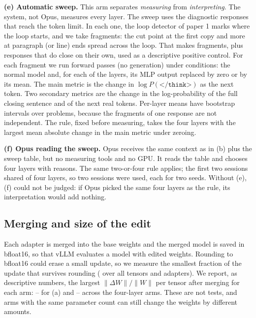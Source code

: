 \documentclass[11pt]{article}
\begin{document}
\textbf{(e) Automatic sweep.} This arm separates \emph{measuring} from \emph{interpreting}. The system, not Opus, measures every layer. The sweep uses the \SweepResponses{} diagnostic responses that reach the token limit. In each one, the loop detector of paper 1 marks where the loop starts, and we take \SweepFragPerResp{} fragments: the cut point at the first copy and \SweepExtraPoints{} more at paragraph (or line) ends spread across the loop. That makes \SweepFragments{} fragments, plus \SweepControl{} responses that do close on their own, used as a descriptive positive control. For each fragment we run forward passes (no generation) under \SweepConditions{} conditions: the normal model and, for each of the \NModelLayers{} layers, its MLP output replaced by zero or by its mean. The main metric is the change in $\log P(\texttt{</think>})$ as the next token. Two secondary metrics are the change in the log-probability of the full closing sentence and of the next \SweepContTokens{} real tokens. Per-layer means have bootstrap intervals over problems, because the fragments of one response are not independent. The rule, fixed before measuring, takes the four layers with the largest mean absolute change in the main metric under zeroing.

\textbf{(f) Opus reading the sweep.} Opus receives the same context as in (b) plus the sweep table, but no measuring tools and no GPU. It reads the table and chooses four layers with reasons. The same two-or-four rule applies; the first two sessions shared \FSharedFirstTwo{} of four layers, so two sessions were used, each for two seeds. Without (e), (f) could not be judged: if Opus picked the same four layers as the rule, its interpretation would add nothing.

\subsection{Merging and size of the edit}\label{sec:3.4}

Each adapter is merged into the base weights and the merged model is saved in bfloat16, so that vLLM evaluates a model with edited weights. Rounding to bfloat16 could erase a small update, so we measure the smallest fraction of the update that survives rounding (\MinKept{} over all tensors and adapters). We report, as descriptive numbers, the largest $\|\Delta W\|/\|W\|$ per tensor after merging for each arm: \DWaLo{}--\DWaHi{} for (a) and \DWfourLo{}--\DWfourHi{} across the four-layer arms. These are not tests, and arms with the same parameter count can still change the weights by different amounts.
\end{document}
